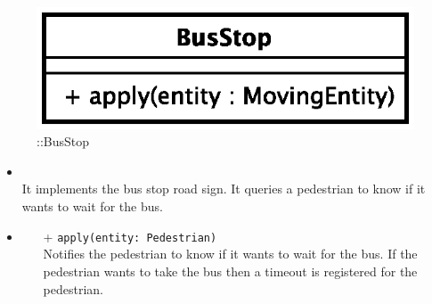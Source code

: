 \begin{figure}[h]
\centering
\includegraphics[scale=0.6,keepaspectratio]{images/solution/app/backend/bus_stop.eps}
\caption{\pPassive::BusStop}
\label{fig:sd-app-bus_stop}
\end{figure}
\FloatBarrier
\begin{itemize}
  \item \textbf{\descr} \\
It implements the bus stop road sign. It queries a pedestrian to know if it wants to wait for the bus.
  \item \textbf{\ops}
  \begin{itemize} 
  \item[+] \texttt{apply(entity: Pedestrian)} \\
Notifies the pedestrian to know if it wants to wait for the bus. If the pedestrian wants
to take the bus then a timeout is registered for the pedestrian.
  \end{itemize}
\end{itemize}

